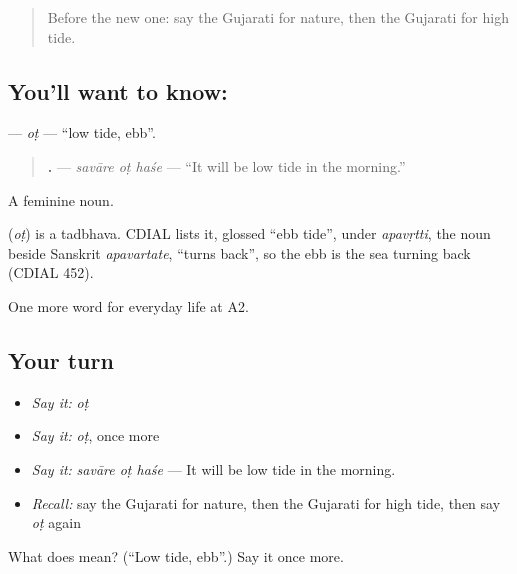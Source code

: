 \label{lesson:GU-C222-ot}



\begin{quote}
Before the new one: say the Gujarati for nature, then the Gujarati for high tide.
\end{quote}

\subsection*{You'll want to know: }
\textbf{} — \emph{oṭ} — \textquotedblleft{}low tide, ebb\textquotedblright{}.

\begin{quote}
\textbf{  .} — \emph{savāre oṭ haśe} — \textquotedblleft{}It will be low tide in the morning.\textquotedblright{}
\end{quote}

A feminine noun.

\begin{cousinweb}
\textbf{} (\emph{oṭ}) is a tadbhava. CDIAL lists it, glossed \textquotedblleft{}ebb tide\textquotedblright{}, under \emph{apavṛtti}, the noun beside Sanskrit \emph{apavartate}, \textquotedblleft{}turns back\textquotedblright{}, so the ebb is the sea turning back (CDIAL 452).
\end{cousinweb}

\begin{grammarlens}[title={What you've built}]
One more word for everyday life at A2.
\end{grammarlens}

\subsection*{Your turn}
\begin{itemize}
\raggedright
  \item \emph{Say it:} \emph{oṭ}
  \item \emph{Say it:} \emph{oṭ}, once more
  \item \emph{Say it:} \emph{savāre oṭ haśe} — It will be low tide in the morning.
  \item \emph{Recall:} say the Gujarati for nature, then the Gujarati for high tide, then say \emph{oṭ} again
\end{itemize}

\begin{tcolorbox}[breakable,colback=teal!4,colframe=teal!35!black,title={Before you move on}]
What does  mean? (\textquotedblleft{}Low tide, ebb\textquotedblright{}.) Say it once more.
\end{tcolorbox}
